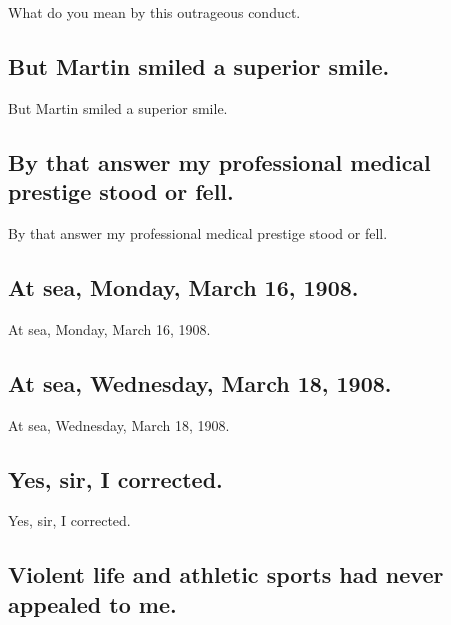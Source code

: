 \documentclass[]{article}
\begin{document}
What do you mean by this outrageous conduct.

\hypertarget{but-martin-smiled-a-superior-smile.}{%
\subsection{But Martin smiled a superior
smile.}\label{but-martin-smiled-a-superior-smile.}}

But Martin smiled a superior smile.

\hypertarget{by-that-answer-my-professional-medical-prestige-stood-or-fell.}{%
\subsection{By that answer my professional medical prestige stood or
fell.}\label{by-that-answer-my-professional-medical-prestige-stood-or-fell.}}

By that answer my professional medical prestige stood or fell.

\hypertarget{at-sea-monday-march-16-1908.}{%
\subsection{At sea, Monday, March 16,
1908.}\label{at-sea-monday-march-16-1908.}}

At sea, Monday, March 16, 1908.

\hypertarget{at-sea-wednesday-march-18-1908.}{%
\subsection{At sea, Wednesday, March 18,
1908.}\label{at-sea-wednesday-march-18-1908.}}

At sea, Wednesday, March 18, 1908.

\hypertarget{yes-sir-i-corrected.}{%
\subsection{Yes, sir, I corrected.}\label{yes-sir-i-corrected.}}

Yes, sir, I corrected.

\hypertarget{violent-life-and-athletic-sports-had-never-appealed-to-me.}{%
\subsection{Violent life and athletic sports had never appealed to
me.}\label{violent-life-and-athletic-sports-had-never-appealed-to-me.}}
\end{document}
